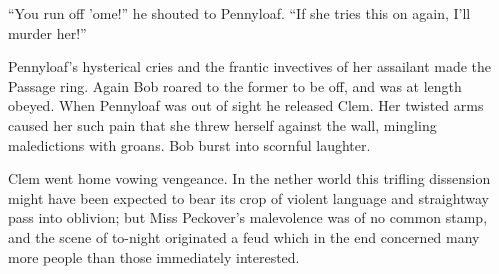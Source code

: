 ``You run off 'ome!'' he shouted to Pennyloaf. ``If she tries this on
again, I'll murder her!''

Pennyloaf's hysterical cries and the frantic invectives of her assailant
made the Passage ring. Again Bob roared to the former to be off, and was
at length obeyed. When Pennyloaf was out of sight he released Clem. Her
twisted arms caused her such pain that she threw herself against the
wall, mingling {}maledictions with groans. Bob burst into scornful
laughter.

Clem went home vowing vengeance. In the nether world this trifling
dissension might have been expected to bear its crop of violent language
and straightway pass into oblivion; but Miss Peckover's malevolence was
of no common stamp, and the scene of to-night originated a feud which in
the end concerned many more people than those immediately interested.
